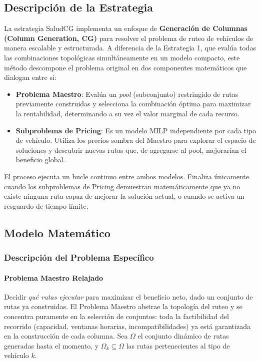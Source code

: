 \documentclass[12pt]{article}
\numberwithin{algorithm}{section}
\begin{document}
\subsection{Descripción de la Estrategia}

La estrategia SaludCG implementa un enfoque de \textbf{Generación de Columnas (Column Generation, CG)} para resolver el problema de ruteo de vehículos de manera escalable y estructurada. A diferencia de la Estrategia 1, que evalúa todas las combinaciones topológicas simultáneamente en un modelo compacto, este método descompone el problema original en dos componentes matemáticos que dialogan entre sí:

\begin{itemize}
    \item \textbf{Problema Maestro}: Evalúa un \textit{pool} (subconjunto) restringido de rutas previamente construidas y selecciona la combinación óptima para maximizar la rentabilidad, determinando a su vez el valor marginal de cada recurso.
    \item \textbf{Subproblema de Pricing}: Es un modelo MILP independiente por cada tipo de vehículo. Utiliza los precios sombra del Maestro para explorar el espacio de soluciones y descubrir nuevas rutas que, de agregarse al pool, mejorarían el beneficio global.
\end{itemize}

El proceso ejecuta un bucle continuo entre ambos modelos. Finaliza únicamente cuando los subproblemas de Pricing demuestran matemáticamente que ya no existe ninguna ruta capaz de mejorar la solución actual, o cuando se activa un resguardo de tiempo límite.

\subsection{Modelo Matemático}

\subsubsection{Descripción del Problema Específico}

\paragraph{Problema Maestro Relajado}

Decidir \emph{qué rutas ejecutar} para maximizar el beneficio neto, dado un conjunto de rutas ya construidas. El Problema Maestro abstrae la topología del ruteo y se concentra puramente en la selección de conjuntos: toda la factibilidad del recorrido (capacidad, ventanas horarias, incompatibilidades) ya está garantizada en la construcción de cada columna. Sea $\Omega$ el conjunto dinámico de rutas generadas hasta el momento, y $\Omega_k \subseteq \Omega$ las rutas pertenecientes al tipo de vehículo $k$.
\end{document}
